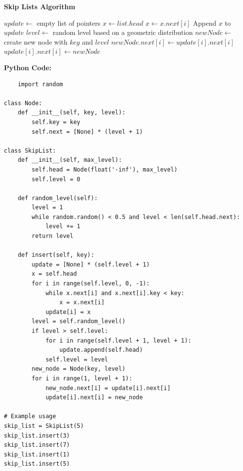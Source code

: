 \documentclass[12pt]{book} %
\begin{document}
\textbf{Skip Lists Algorithm}
\FloatBarrier
\begin{algorithm}[H]
\caption{Skip List Insertion}
\begin{algorithmic}[1]
    \State $update \gets$ empty list of pointers
    \State $x \gets list.head$
            \State $x \gets x.next[i]$
        \EndWhile
        \State Append $x$ to $update$
    \EndFor
    \State $level \gets$ random level based on a geometric distribution
    \State $newNode \gets$ create new node with $key$ and $level$
        \State $newNode.next[i] \gets update[i].next[i]$
        \State $update[i].next[i] \gets newNode$
    \EndFor
\EndFunction
\end{algorithmic}
\end{algorithm}
\FloatBarrier
\textbf{Python Code:}
\FloatBarrier
\begin{lstlisting}
    import random

class Node:
    def __init__(self, key, level):
        self.key = key
        self.next = [None] * (level + 1)

class SkipList:
    def __init__(self, max_level):
        self.head = Node(float('-inf'), max_level)
        self.level = 0

    def random_level(self):
        level = 1
        while random.random() < 0.5 and level < len(self.head.next):
            level += 1
        return level

    def insert(self, key):
        update = [None] * (self.level + 1)
        x = self.head
        for i in range(self.level, 0, -1):
            while x.next[i] and x.next[i].key < key:
                x = x.next[i]
            update[i] = x
        level = self.random_level()
        if level > self.level:
            for i in range(self.level + 1, level + 1):
                update.append(self.head)
            self.level = level
        new_node = Node(key, level)
        for i in range(1, level + 1):
            new_node.next[i] = update[i].next[i]
            update[i].next[i] = new_node

# Example usage
skip_list = SkipList(5)
skip_list.insert(3)
skip_list.insert(7)
skip_list.insert(1)
skip_list.insert(5)
\end{lstlisting}
\FloatBarrier
\end{document}
